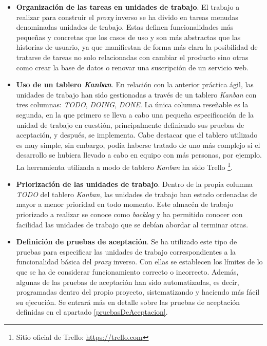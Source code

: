 \documentclass[11pt,spanish,listoffigures]{tfgetsinf}
\begin{document}
\begin{itemize}

	\item \textbf{Organización de las tareas en unidades de trabajo}. El trabajo a realizar para construir el \emph{proxy} inverso se ha divido en tareas menudas denominadas unidades de trabajo. Estas definen funcionalidades más pequeñas y concretas que los casos de uso y son más abstractas que las historias de usuario, ya que manifiestan de forma más clara la posibilidad de tratarse de tareas no solo relacionadas con cambiar el producto sino otras como crear la base de datos o renovar una suscripción de un servicio web.

	\item \textbf{Uso de un tablero \emph{Kanban}}. En relación con la anterior práctica ágil, las unidades de trabajo han sido gestionadas a través de un tablero \emph{Kanban} con tres columnas: \emph{TODO}, \emph{DOING}, \emph{DONE}. La única columna reseñable es la segunda, en la que primero se lleva a cabo una pequeña especificación de la unidad de trabajo en cuestión, principalmente definiendo sus pruebas de aceptación, y después, se implementa. Cabe destacar que el tablero utilizado es muy simple, sin embargo, podía haberse tratado de uno más complejo si el desarrollo se hubiera llevado a cabo en equipo con más personas, por ejemplo. La herramienta utilizada a modo de tablero \emph{Kanban} ha sido Trello \footnote{Sitio oficial de Trello: \url{https://trello.com}}.

	\item \textbf{Priorización de las unidades de trabajo}. Dentro de la propia columna \emph{TODO} del tablero \emph{Kanban}, las unidades de trabajo han estado ordenadas de mayor a menor prioridad en todo momento. Este almacén de trabajo priorizado a realizar se conoce como \emph{backlog} y ha permitido conocer con facilidad las unidades de trabajo que se debían abordar al terminar otras.

	\item \textbf{Definición de pruebas de aceptación}. Se ha utilizado este tipo de pruebas para especificar las unidades de trabajo correspondientes a la funcionalidad básica del \emph{proxy} inverso. Con ellas se establecen los límites de lo que se ha de considerar funcionamiento correcto o incorrecto. Además, algunas de las pruebas de aceptación han sido automatizadas, es decir, programadas dentro del propio proyecto, sistematizando y haciendo más fácil su ejecución. Se entrará más en detalle sobre las pruebas de aceptación definidas en el apartado \ref{pruebasDeAceptacion}.


\end{itemize}
\end{document}
